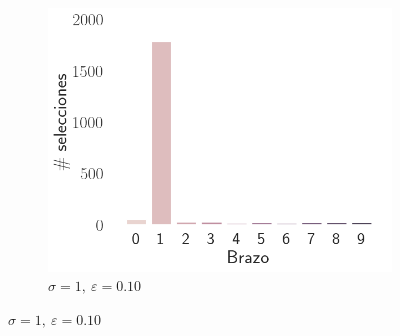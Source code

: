 \documentclass[12pt]{article}
\begin{document}
\begin{figure}[H]
\begin{subfigure}[H]{0.3\textwidth}
            \includegraphics[width=\textwidth]{../img/2000/arm_sigma_1_epsilon_0.1}
            \caption{$\sigma=1 ,\ \varepsilon=0.10$}
            \label{fig:arms_selected_1_0.1}
        \end{subfigure}


\end{figure}
\end{document}
